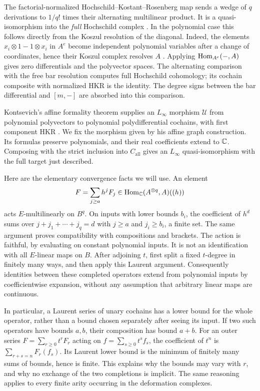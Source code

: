 The factorial-normalized Hochschild--Kostant--Rosenberg map sends a
wedge of $q$ derivations to $1/q!$ times their alternating multilinear
product.  It is a quasi-isomorphism into the \emph{full} Hochschild
complex \cite{HKR1962}.  In the polynomial case this follows directly
from the Koszul resolution of the diagonal.  Indeed, the elements
$x_i\otimes1-1\otimes x_i$ in $A^e$ become independent polynomial
variables after a change of coordinates, hence their Koszul complex
resolves $A$ \cite{StacksKoszul}.  Applying $\operatorname{Hom}_{A^e}(-,A)$ gives zero
differentials and the polyvector spaces.  The alternating comparison
with the free bar resolution computes full Hochschild cohomology;
its cochain composite with normalized HKR is the identity.  The degree
signs between the bar differential and $[m,-]$ are absorbed into this
comparison.

Kontsevich's affine formality theorem supplies an $L_\infty$ morphism
$\mathcal U$ from polynomial polyvectors to polynomial polydifferential
cochains, with first component HKR
\cite[\S\S4.6.2, 6.4 of the arXiv version]{Kontsevich2003}.
We fix the morphism given by his affine graph construction. Its formulas preserve
polynomials, and their real coefficients extend to $\mathbb C$.  Composing
with the strict inclusion into $C_{\mathrm{all}}$ gives an $L_\infty$
quasi-isomorphism with the full target just described.

Here are the elementary convergence facts we will use.  An element
\[
 F=\sum_{j\ge a}h^jF_j
 \in\operatorname{Hom}_{\mathbb C}(A^{\otimes q},A)((h))
\]
acts $E$-multilinearly on $B^q$.  On inputs with lower bounds $b_i$,
the coefficient of $h^d$ sums over
$j+j_1+\cdots+j_q=d$ with $j\ge a$ and $j_i\ge b_i$, a finite set.
The same argument proves compatibility with compositions and brackets.
The action is faithful, by evaluating on constant polynomial inputs.
It is not an identification with all $E$-linear maps on $B$.
After adjoining $t$, first split a fixed $t$-degree in finitely many
ways, and then apply this Laurent argument.  Consequently identities
between these completed operators extend from polynomial inputs by
coefficientwise expansion, without any assumption that arbitrary
linear maps are continuous.

In particular, a Laurent series of unary cochains has a lower bound
for the whole operator, rather than a bound chosen separately after
seeing its input.  If two such operators have bounds $a,b$, their
composition has bound $a+b$.  For an outer series
$F=\sum_{r\ge0}t^rF_r$ acting on
$f=\sum_{s\ge0}t^sf_s$, the coefficient of $t^n$ is
$\sum_{r+s=n}F_r(f_s)$.  Its Laurent lower bound is the minimum of
finitely many sums of bounds, hence is finite.  This explains why
the bounds may vary with $r$, and why no exchange of the two
completions is implicit.  The same reasoning applies to every finite
arity occurring in the deformation complexes.

